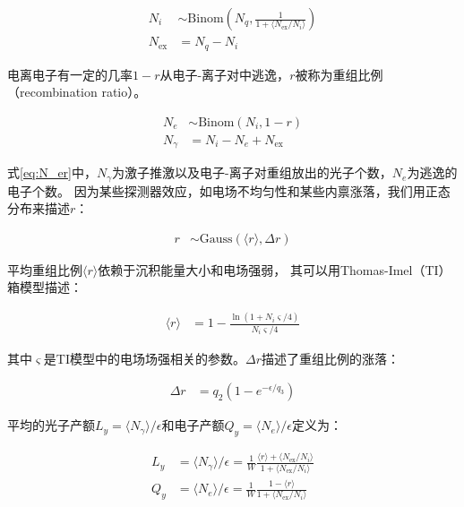 \begin{align}
    \label{eq:N_iex}
    N_i &\sim \mathrm{Binom}\left(N_q,\frac{1}{1+\langle N_{\mathrm{ex}}/N_{i}\rangle}\right) \\
    N_{\mathrm{ex}} &= N_q - N_i
\end{align}

电离电子有一定的几率$1-r$从电子-离子对中逃逸，$r$被称为重组比例（\mbox{recombination} ratio）。

\begin{align}
    \label{eq:N_er}
    N_e &\sim \mathrm{Binom}\left(N_i,1-r\right) \\
    N_\gamma &= N_i - N_e + N_{\mathrm{ex}}
\end{align}

式\ref{eq:N_er}中，$N_\gamma$为激子推激以及电子-离子对重组放出的光子个数，$N_{e}$为逃逸的电子个数。
因为某些探测器效应，如电场不均匀性和某些内禀涨落\cite{lux_collaboration_tritium_2016}，我们用正态分布来描述$r$：

\begin{align}
    \label{eq:r}
    r &\sim \mathrm{Gauss}\left(\langle r\rangle,\Delta r\right)
\end{align}

平均重组比例$\langle r\rangle$依赖于沉积能量大小和电场强弱，
其可以用Thomas-Imel（TI）箱模型描述\cite{thomas_recombination_1987}：

\begin{align}
    \label{eq:mr}
    \langle r\rangle &= 1 - \frac{\ln{\left(1+N_i\varsigma/4\right)}}{N_i\varsigma/4}
\end{align}

其中$\varsigma$是TI模型中的电场场强相关的参数。$\Delta r$描述了重组比例的涨落：

\begin{align}
    \label{eq:sr}
    \Delta r &= q_2\left(1-e^{-\epsilon/q_3}\right)
\end{align}

平均的光子产额$L_y=\langle N_\gamma\rangle/\epsilon$和电子产额$Q_y=\langle N_e\rangle/\epsilon$定义为：

\begin{align}
    \label{eq:N_g}
    L_y &= \langle N_\gamma\rangle/\epsilon = \frac{1}{W}\frac{\langle r\rangle+\langle N_{\mathrm{ex}}/N_i\rangle}{1+\langle N_{\mathrm{ex}}/N_i\rangle} \\
    \label{eq:N_e}
    Q_y &= \langle N_e\rangle/\epsilon = \frac{1}{W}\frac{1-\langle r\rangle}{1+\langle N_{\mathrm{ex}}/N_i\rangle}
\end{align}


